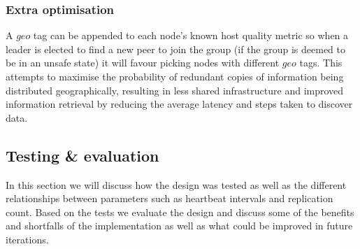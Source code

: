 %

\subsubsection{Extra optimisation}

A $geo$ tag can be appended to each node's known host quality metric so when a leader is elected to find a new peer to join the group (if the group is deemed to be in an unsafe state) it will favour picking nodes with different $geo$ tags. This attempts to maximise the probability of redundant copies of information being distributed geographically, resulting in less shared infrastructure and improved information retrieval by reducing the average latency and steps taken to discover data.

\subsection{Testing \& evaluation}

In this section we will discuss how the design was tested as well as the different relationships between parameters such as heartbeat intervals and replication count. Based on the tests we evaluate the design and discuss some of the benefits and shortfalls of the implementation as well as what could be improved in future iterations.

